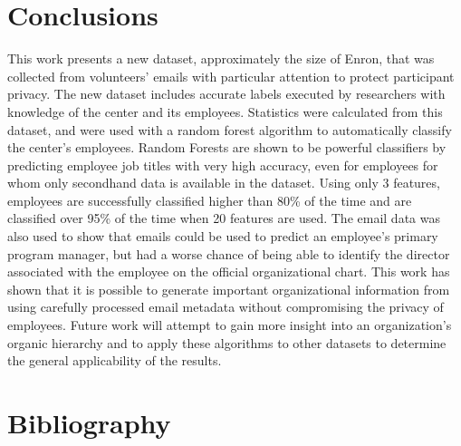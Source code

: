 \documentclass[12pt]{report}
\begin{document}
\chapter{Conclusions} \label{Conclusions}
This work presents a new dataset, approximately the size of Enron, that was collected from volunteers' emails with particular attention to protect participant privacy.
The new dataset includes accurate labels executed by researchers with knowledge of the center and its employees.
Statistics were calculated from this dataset, and were used with a random forest algorithm to automatically classify the center's employees.
Random Forests are shown to be powerful classifiers by predicting employee job titles with very high accuracy, even for employees for whom only secondhand data is available in the dataset.
Using only 3 features, employees are successfully classified higher than 80\% of the time and are classified over 95\% of the time when 20 features are used.
The email data was also used to show that emails could be used to predict an employee's primary program manager, but had a worse chance of being able to identify the director associated with the employee on the official organizational chart.
This work has shown that it is possible to generate important organizational information from using carefully processed email metadata without compromising the privacy of employees.
Future work will attempt to gain more insight into an organization's organic hierarchy and to apply these algorithms to other datasets to determine the general applicability of the results.




%
%

%



\chapter*{Bibliography}




\end{document}
